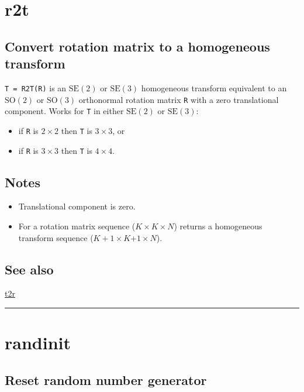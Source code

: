 \hypertarget{r2t}{\section*{r2t}}
\subsection*{Convert rotation matrix to a homogeneous transform}


\texttt{T = R2T(R)} is an $\mbox{SE}(2)$ or $\mbox{SE}(3)$ homogeneous transform equivalent to an
$\mbox{SO}(2)$ or $\mbox{SO}(3)$ orthonormal rotation matrix \texttt{R} with a zero translational
component. Works for \texttt{T} in either $\mbox{SE}(2)$ or $\mbox{SE}(3)$:

\begin{itemize}
  \item if \texttt{R} is $2 \times 2$ then \texttt{T} is $3 \times 3$, or
  \item if \texttt{R} is $3 \times 3$ then \texttt{T} is $4 \times 4$.
\end{itemize}

\subsection*{Notes}
\begin{itemize}
  \item Translational component is zero.
  \item For a rotation matrix sequence ($K \times K \times N$) returns a homogeneous transform    sequence ($K+1 \times K$+$1 \times N$).
\end{itemize}

\subsection*{See also}


\hyperlink{t2r}{\color{blue} t2r}

\vspace{1.5ex}\rule{\textwidth}{1mm}

\hypertarget{randinit}{\section*{randinit}}
\subsection*{Reset random number generator}


